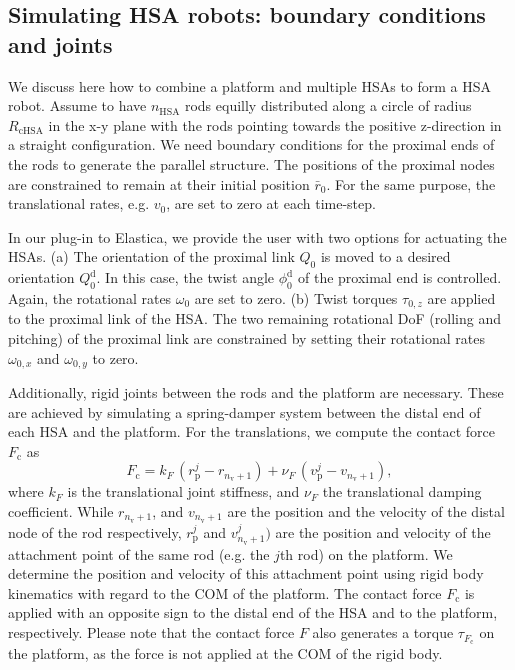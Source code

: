 \subsection{Simulating HSA robots: boundary conditions and joints}\label{sub:hsamodel:hsa_robot_simulation:hsa_robots}
%
We discuss here how to combine a platform and multiple \glspl{HSA} to form a \gls{HSA} robot.  Assume to have $n_\mathrm{HSA}$ rods equilly distributed along a circle of radius $R_\mathrm{cHSA}$ in the x-y plane with the rods pointing towards the positive z-direction in a straight configuration.
%
We need boundary conditions for the proximal ends of the rods to generate the parallel structure. The positions of the proximal nodes are constrained to remain at their initial position $\bar{r}_{0}$.
For the same purpose, the translational rates, e.g. $v_0$, are set to zero at each time-step. 

In our plug-in to Elastica, we provide the user with two options for actuating the \glspl{HSA}. (a) The orientation of the proximal link $Q_{0}$ is moved to a desired orientation $Q_{0}^\mathrm{d}$. In this case, the twist angle $\phi_0^\mathrm{d}$ of the proximal end is controlled. Again, the rotational rates $\omega_0$ are set to zero. 
(b) Twist torques $\tau_{0,z}$ are applied to the proximal link of the \gls{HSA}. The two remaining rotational DoF (rolling and pitching) of the proximal link are constrained by setting their rotational rates $\omega_{0,x}$ and $\omega_{0,y}$ to zero.

Additionally, rigid joints between the rods and the platform are necessary. These are achieved by simulating a spring-damper system between the distal end of each \gls{HSA} and the platform. For the translations, we compute the contact force $F_\mathrm{c}$ as 
\begin{equation}
    F_\mathrm{c} = k_F \, (r_\mathrm{p}^j - r_{n_\mathrm{v}+1}) + \nu_F \, (v_\mathrm{p}^j - v_{n_\mathrm{v}+1}),
\end{equation}
where $k_F$ is the translational joint stiffness, and $\nu_F$ the translational damping coefficient. While $r_{n_\mathrm{v}+1}$, and $v_{n_\mathrm{v}+1}$ are the position and the velocity of the distal node of the rod respectively, $r_\mathrm{p}^j$ and $v_{n_\mathrm{v}+1}^j)$ are the position and velocity of the attachment point of the same rod (e.g. the $j$th rod) on the platform. We determine the position and velocity of this attachment point using rigid body kinematics with regard to the \gls{COM} of the platform. The contact force $F_\mathrm{c}$ is applied with an opposite sign to the distal end of the \gls{HSA} and to the platform, respectively. Please note that the contact force $F$ also generates a torque $\tau_{F_\mathrm{c}}$ on the platform, as the force is not applied at the \gls{COM} of the rigid body.

